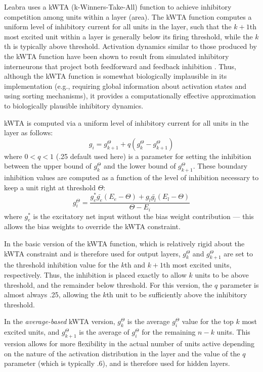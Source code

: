 \documentclass[10pt,letterpaper]{article}
\numberwithin{equation}{section}
\begin{document}
Leabra uses a kWTA (k-Winners-Take-All) function to achieve inhibitory
competition among units within a layer (area). The kWTA function
computes a uniform level of inhibitory current for all units in the
layer, such that the $k+1$th most excited unit within a layer is
generally below its firing threshold, while the $k$th is typically
above threshold. Activation dynamics similar to those produced by the
kWTA function have been shown to result from simulated inhibitory
interneurons that project both feedforward and feedback inhibition
\cite{OReilly:2000}. Thus, although the kWTA function is
somewhat biologically implausible in its implementation (e.g.,
requiring global information about activation states and using sorting
mechanisms), it provides a computationally effective approximation to
biologically plausible inhibitory dynamics.

kWTA is computed via a uniform level of inhibitory current for all
units in the layer as follows:
\begin{equation}
 g_i = g^{\Theta}_{k+1} + q (g^{\Theta}_k - g^{\Theta}_{k+1})
 \label{eq.g_i}
\end{equation}
where $0<q<1$ (.25 default used here) is a parameter for setting the
inhibition between the upper bound of $g^{\Theta}_k$ and the lower
bound of $g^{\Theta}_{k+1}$. These boundary inhibition values are
computed as a function of the level of inhibition necessary to keep a
unit right at threshold $\Theta$:
\begin{equation}
 g_i^{\Theta} = \frac{g^*_e \bar{g_e} (E_e - \Theta) +
  g_l \bar{g_l} (E_l - \Theta)}{\Theta - E_i}
 \label{eq.i_at_thr}
\end{equation}
where $g^*_e$ is the excitatory net input without the bias weight
contribution --- this allows the bias weights to override the kWTA
constraint.

In the basic version of the kWTA function, which is relatively rigid
about the kWTA constraint and is therefore used for output layers,
$g^{\Theta}_k$ and $g^{\Theta}_{k+1}$ are set to the threshold
inhibition value for the $k$th and $k+1$th most excited units,
respectively. Thus, the inhibition is placed exactly to allow $k$
units to be above threshold, and the remainder below threshold. For
this version, the $q$ parameter is almost always .25, allowing the
$k$th unit to be sufficiently above the inhibitory threshold.

In the {\em average-based} kWTA version, $g^{\Theta}_k$ is the average
$g_i^{\Theta}$ value for the top $k$ most excited units, and
$g^{\Theta}_{k+1}$ is the average of $g_i^{\Theta}$ for the remaining
$n-k$ units. This version allows for more flexibility in the actual
number of units active depending on the nature of the activation
distribution in the layer and the value of the $q$ parameter (which is
typically .6), and is therefore used for hidden layers.
\end{document}
